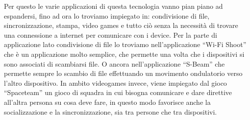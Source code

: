 Per questo le varie applicazioni di questa tecnologia vanno pian piano ad espandersi, fino ad ora lo troviamo impiegato in: 
condivisione di file, sincronizzazione, stampa, video games e tutto ciò senza la necessità di trovare una connessione a internet per comunicare con i device.
Per la parte di applicazione lato condivisione di file lo troviamo nell’applicazione “Wi-Fi Shoot” che è un applicazione molto semplice, che permette una volta che i dispositivi si sono associati di scambiarsi file.
O ancora nell’applicazione “S-Beam” che permette sempre lo scambio di file effettuando un movimento ondulatorio verso l’altro dispositivo.
In ambito videogames invece, viene impiegato dal gioco “Spaceteam” un gioco di squadra in cui bisogna comunicare e dare direttive all’altra persona su cosa deve fare, in questo modo favorisce anche la socializzazione e la sincronizzazione, sia tra persone che tra dispositivi.


\clearpage{\pagestyle{empty}\cleardoublepage}